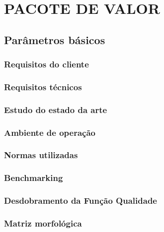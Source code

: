 \chapter{PACOTE DE VALOR}
\label{chap:conce}

\section{Parâmetros básicos}
\label{sec:basi}


\subsection{Requisitos do cliente}
\label{sub:reqc}


\subsection{Requisitos técnicos}
\label{sub:reqt}


\subsection{Estudo do estado da arte}
\label{sub:sota}


\subsection{Ambiente de operação}
\label{sub:ambiente}


\subsection{Normas utilizadas}
\label{sub:normas}


\subsection{Benchmarking}
\label{sub:bench}


\subsection{Desdobramento da Função Qualidade}
\label{sub:qfd}


\subsection{Matriz morfológica}
\label{sub:matmorf}


